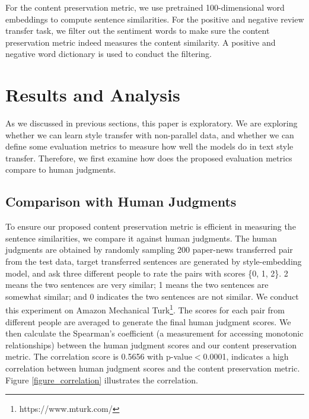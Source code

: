 \documentclass[letterpaper]{article} \usepackage{aaai18}  \usepackage{times}  \usepackage{helvet}  \usepackage{courier}  \usepackage{url}  \usepackage{graphicx}  \usepackage{amsmath}
\begin{document}
For the content preservation metric, we use pretrained 100-dimensional word embeddings to compute sentence similarities. 
For the positive and negative review transfer task, we filter out the sentiment words to make sure the content preservation metric  
indeed measures the content similarity. 
A positive and negative word dictionary is used to conduct the filtering. 

\section{Results and Analysis}

As we discussed in previous sections, this paper is exploratory. We are exploring whether we can learn style transfer with 
non-parallel data, and whether we can define some evaluation metrics to measure how well the models do in text style transfer.
Therefore, we first examine how does the proposed evaluation metrics compare to human judgments.

\subsection{Comparison with Human Judgments} 
To ensure our proposed content preservation metric is efficient in measuring the sentence similarities, we compare it against human judgments. 
The human judgments are obtained by randomly sampling 200 paper-news transferred pair from the test data,
target transferred sentences are generated by style-embedding model, 
and ask three different people to rate the pairs with scores \{0, 1, 2\}. 
2 means the two sentences are very similar; 1 means the two sentences 
are somewhat similar; and 0 indicates the two sentences are not similar. 
We conduct this experiment on Amazon Mechanical Turk\footnote{https://www.mturk.com/}. 
The scores for each pair from different people are averaged to generate the final human judgment scores. 
We then calculate the Spearman's coefficient (a measurement for accessing monotonic relationships) between the human judgment scores 
and our content preservation metric. 
The correlation score is 0.5656 with p-value$<$0.0001, indicates a high correlation between human judgment scores and the 
content preservation metric.  
Figure \ref{figure_correlation} illustrates the correlation.
\end{document}
